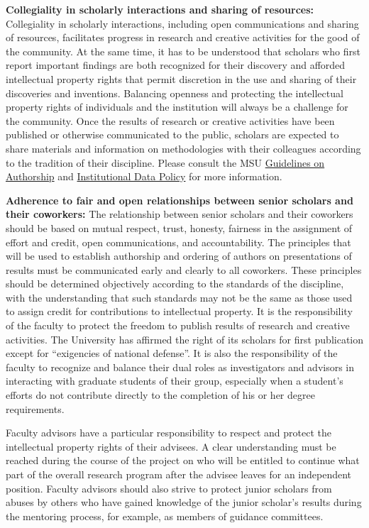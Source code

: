 \textbf{Collegiality in scholarly interactions and sharing of
  resources:} Collegiality in scholarly interactions, including open
communications and sharing of resources, facilitates progress in
research and creative activities for the good of the community. At the
same time, it has to be understood that scholars who first report
important findings are both recognized for their discovery and
afforded intellectual property rights that permit discretion in the
use and sharing of their discoveries and inventions. Balancing
openness and protecting the intellectual property rights of
individuals and the institution will always be a challenge for the
community. Once the results of research or creative activities have
been published or otherwise communicated to the public, scholars are
expected to share materials and information on methodologies with
their colleagues according to the tradition of their discipline.
Please consult the MSU
\href{http://vprgs.msu.edu/michigan-state-university-guidelines-authorship}{Guidelines
on Authorship} and
\href{https://tech.msu.edu/about/guidelines-policies/msu-institutional-data-policy/}{Institutional
Data Policy} for more information.

\textbf{Adherence to fair and open relationships between senior
  scholars and their coworkers:} The relationship between senior
scholars and their coworkers should be based on mutual respect, trust,
honesty, fairness in the assignment of effort and credit, open
communications, and accountability. The principles that will be used
to establish authorship and ordering of authors on presentations of
results must be communicated early and clearly to all coworkers. These
principles should be determined objectively according to the standards
of the discipline, with the understanding that such standards may not
be the same as those used to assign credit for contributions to
intellectual property. It is the responsibility of the faculty to
protect the freedom to publish results of research and creative
activities. The University has affirmed the right of its scholars for
first publication except for “exigencies of national defense”. It is
also the responsibility of the faculty to recognize and balance their
dual roles as investigators and advisors in interacting with graduate
students of their group, especially when a student's efforts do not
contribute directly to the completion of his or her degree
requirements. 

Faculty advisors have a particular responsibility to respect and
protect the intellectual property rights of their advisees. A clear
understanding must be reached during the course of the project on who
will be entitled to continue what part of the overall research program
after the advisee leaves for an independent position. Faculty advisors
should also strive to protect junior scholars from abuses by others
who have gained knowledge of the junior scholar's results during the
mentoring process, for example, as members of guidance committees. 

